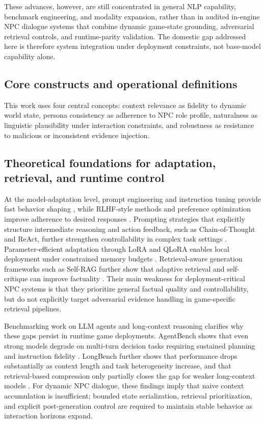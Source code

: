 ﻿\documentclass[a4paper,12pt]{article}
\begin{document}
These advances, however, are still concentrated in general NLP capability, benchmark engineering, and modality expansion, rather than in audited in-engine NPC dialogue systems that combine dynamic game-state grounding, adversarial retrieval controls, and runtime-parity validation. The domestic gap addressed here is therefore system integration under deployment constraints, not base-model capability alone.

\subsection{Core constructs and operational definitions}
This work uses four central concepts: context relevance as fidelity to dynamic world state, persona consistency as adherence to NPC role profile, naturalness as linguistic plausibility under interaction constraints, and robustness as resistance to malicious or inconsistent evidence injection.

\subsection{Theoretical foundations for adaptation, retrieval, and runtime control}
At the model-adaptation level, prompt engineering and instruction tuning provide fast behavior shaping \cite{Liu2021PromptSurvey}, while RLHF-style methods and preference optimization improve adherence to desired responses \cite{Ouyang2022InstructGPT,Rafailov2023DPO}. Prompting strategies that explicitly structure intermediate reasoning and action feedback, such as Chain-of-Thought and ReAct, further strengthen controllability in complex task settings \cite{Wei2022CoT,Yao2023ReAct}. Parameter-efficient adaptation through LoRA and QLoRA enables local deployment under constrained memory budgets \cite{Hu2021LoRA,Dettmers2023QLoRA}. Retrieval-aware generation frameworks such as Self-RAG further show that adaptive retrieval and self-critique can improve factuality \cite{Asai2024SelfRAG}. Their main weakness for deployment-critical NPC systems is that they prioritize general factual quality and controllability, but do not explicitly target adversarial evidence handling in game-specific retrieval pipelines.

Benchmarking work on LLM agents and long-context reasoning clarifies why these gaps persist in runtime game deployments. AgentBench shows that even strong models degrade on multi-turn decision tasks requiring sustained planning and instruction fidelity \cite{Liu2023AgentBench}. LongBench further shows that performance drops substantially as context length and task heterogeneity increase, and that retrieval-based compression only partially closes the gap for weaker long-context models \cite{Bai2024LongBench}. For dynamic NPC dialogue, these findings imply that naive context accumulation is insufficient; bounded state serialization, retrieval prioritization, and explicit post-generation control are required to maintain stable behavior as interaction horizons expand.
\end{document}
